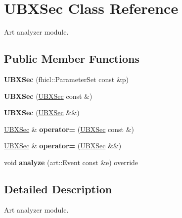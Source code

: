 \hypertarget{classUBXSec}{\section{\-U\-B\-X\-Sec \-Class \-Reference}
\label{classUBXSec}
}


\-Art analyzer module.  


\subsection*{\-Public \-Member \-Functions}
\begin{DoxyCompactItemize}
\item 
\hypertarget{classUBXSec_a002d19d94378dc90587c10bd4b498c4b}{{\bfseries \-U\-B\-X\-Sec} (fhicl\-::\-Parameter\-Set const \&p)}\label{classUBXSec_a002d19d94378dc90587c10bd4b498c4b}

\item 
\hypertarget{classUBXSec_addfe39c7f3bf37d69254df5e87a9508b}{{\bfseries \-U\-B\-X\-Sec} (\hyperlink{classUBXSec}{\-U\-B\-X\-Sec} const \&)}\label{classUBXSec_addfe39c7f3bf37d69254df5e87a9508b}

\item 
\hypertarget{classUBXSec_a82ac81ae3bb5afe3f414449ad1cfa7ce}{{\bfseries \-U\-B\-X\-Sec} (\hyperlink{classUBXSec}{\-U\-B\-X\-Sec} \&\&)}\label{classUBXSec_a82ac81ae3bb5afe3f414449ad1cfa7ce}

\item 
\hypertarget{classUBXSec_a2fd957f5a0697d933bd55bfbc17fee46}{\hyperlink{classUBXSec}{\-U\-B\-X\-Sec} \& {\bfseries operator=} (\hyperlink{classUBXSec}{\-U\-B\-X\-Sec} const \&)}\label{classUBXSec_a2fd957f5a0697d933bd55bfbc17fee46}

\item 
\hypertarget{classUBXSec_a1034e664c80f3fbd3eea29d209f58196}{\hyperlink{classUBXSec}{\-U\-B\-X\-Sec} \& {\bfseries operator=} (\hyperlink{classUBXSec}{\-U\-B\-X\-Sec} \&\&)}\label{classUBXSec_a1034e664c80f3fbd3eea29d209f58196}

\item 
\hypertarget{classUBXSec_a30a2981a63a32be7d7b8819bb462e859}{void {\bfseries analyze} (art\-::\-Event const \&e) override}\label{classUBXSec_a30a2981a63a32be7d7b8819bb462e859}

\end{DoxyCompactItemize}


\subsection{\-Detailed \-Description}
\-Art analyzer module. 


